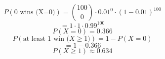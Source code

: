\documentclass[12pt]{article}
\begin{document}
\[
P(0 \text{ wins (X=0)}) = \binom{100}{0} \cdot 0.01^{0} \cdot (1 - 0.01)^{100}
\]
\[
= 1 \cdot 1 \cdot 0.99^{100}
\]
\[
P(X=0)= 0.366
\]
\[
P(\text{at least }1 \text{ win (}X \ge 1\text{)}) = 1 - P(X = 0)
\]
\[
= 1 - 0.366
\]
\[
P(X \ge 1 ) \approx 0.634
\]
\end{document}
